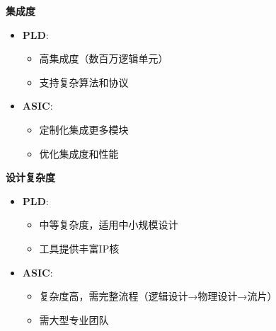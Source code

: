\documentclass[
  ignorenonframetext,
  chinese,
]{beamer}
\providecommand{\tightlist}{%
  \setlength{\itemsep}{0pt}\setlength{\parskip}{0pt}}
\begin{document}
\begin{frame}
\textbf{集成度}

\begin{itemize}
\tightlist
\item
  \textbf{PLD}:

  \begin{itemize}
  \tightlist
  \item
    高集成度（数百万逻辑单元）\\
  \item
    支持复杂算法和协议\\
  \end{itemize}
\item
  \textbf{ASIC}:

  \begin{itemize}
  \tightlist
  \item
    定制化集成更多模块\\
  \item
    优化集成度和性能
  \end{itemize}
\end{itemize}

\textbf{设计复杂度}

\begin{itemize}
\tightlist
\item
  \textbf{PLD}:

  \begin{itemize}
  \tightlist
  \item
    中等复杂度，适用中小规模设计\\
  \item
    工具提供丰富IP核\\
  \end{itemize}
\item
  \textbf{ASIC}:

  \begin{itemize}
  \tightlist
  \item
    复杂度高，需完整流程（逻辑设计→物理设计→流片）\\
  \item
    需大型专业团队
  \end{itemize}
\end{itemize}
\end{frame}
\end{document}
